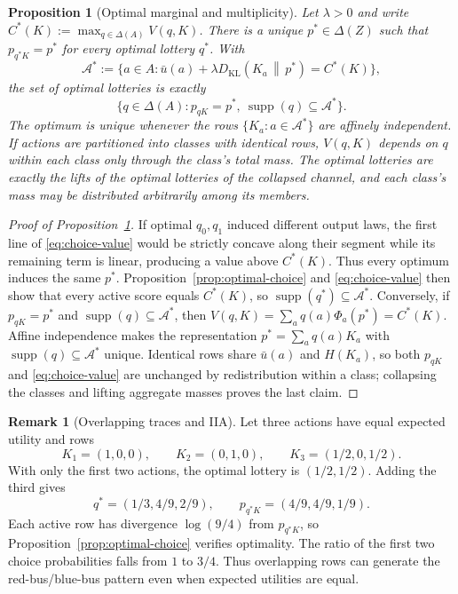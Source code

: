 \documentclass[11pt,a4paper]{article}
\newtheorem{proposition}[theorem]{Proposition}
\theoremstyle{definition}
\newtheorem{remark}[theorem]{Remark}
\newcommand{\D}{\Delta}
\newcommand{\Sh}{H}
\newcommand{\supp}{\operatorname{supp}}
\newcommand{\KL}{D_{\mathrm{KL}}}
\newcommand{\1}{\mathbf 1}
\begin{document}
\begin{proposition}[Optimal marginal and multiplicity]\label{prop:optimal-marginal}
Let $\lambda>0$ and write $C^*(K):=\max_{q\in\D(A)}V(q,K)$.  There is a unique $p^*\in\D(Z)$ such that
$p_{q^*K}=p^*$ for every optimal lottery $q^*$.  With
\[
 \mathcal A^*
 :=\bigl\{a\in A:
 \bar u(a)+\lambda
 \KL\!\left(K_a\,\middle\|\,p^*\right)=C^*(K)
 \bigr\},
\]
the set of optimal lotteries is exactly
\[
 \bigl\{q\in\D(A):
 p_{qK}=p^*,\ \supp(q)\subseteq\mathcal A^*
 \bigr\}.
\]
The optimum is unique whenever the rows $\{K_a:a\in\mathcal A^*\}$ are affinely independent.  If actions are
partitioned into classes with identical rows, $V(q,K)$ depends on $q$ within each class only through the class's
total mass.  The optimal lotteries are exactly the lifts of the optimal lotteries of the collapsed channel, and
each class's mass may be distributed arbitrarily among its members.
\end{proposition}

\begin{proof}[Proof of Proposition~\ref{prop:optimal-marginal}]
If optimal $q_0,q_1$ induced different output laws, the first line of
\eqref{eq:choice-value} would be strictly concave along their segment while
its remaining term is linear, producing a value above $C^*(K)$.  Thus every
optimum induces the same $p^*$.  Proposition~\ref{prop:optimal-choice} and
\eqref{eq:choice-value} then show that every active score equals $C^*(K)$,
so $\supp(q^*)\subseteq\mathcal A^*$.  Conversely, if $p_{qK}=p^*$ and
$\supp(q)\subseteq\mathcal A^*$, then
$V(q,K)=\sum_aq(a)\Phi_a(p^*)=C^*(K)$.
Affine independence makes the representation $p^*=\sum_aq(a)K_a$ with $\supp(q)\subseteq\mathcal A^*$ unique.
Identical rows share $\bar u(a)$ and $\Sh(K_a)$, so both $p_{qK}$ and
\eqref{eq:choice-value} are
unchanged by redistribution within a class; collapsing the classes and lifting aggregate masses proves the last
claim.
\end{proof}

\begin{remark}[Overlapping traces and IIA]\label{rem:overlap-iia-example}
Let three actions have equal expected utility and rows
\[
 K_1=(1,0,0),\qquad K_2=(0,1,0),\qquad K_3=(1/2,0,1/2).
\]
With only the first two actions, the optimal lottery is $(1/2,1/2)$.  Adding the third gives
\[
 q^*=(1/3,4/9,2/9),\qquad p_{q^*K}=(4/9,4/9,1/9).
\]
Each active row has divergence $\log(9/4)$ from $p_{q^*K}$, so
Proposition~\ref{prop:optimal-choice} verifies optimality.  The ratio of the first two choice probabilities falls
from $1$ to $3/4$.  Thus overlapping rows can generate the red-bus/blue-bus pattern even when expected utilities
are equal.
\end{remark}
\end{document}
